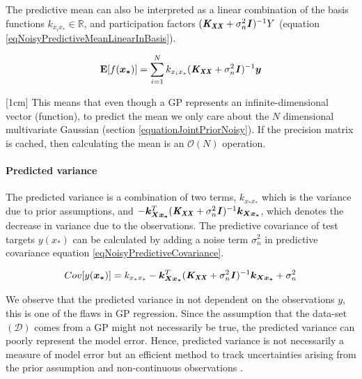 The predictive mean can also be interpreted as a linear combination of the basis functions $k_{x_{i}x_{*}} \in \mathbb{R}$, and participation factors $( \bm{\mathit{K_{XX}}} + \sigma^{2}_{n}\bm{\mathit{I}})^{-1}Y$ (equation \ref{eqNoisyPredictiveMeanLinearInBasis}). 

  \begin{equation}\label{eqNoisyPredictiveMeanLinearInBasis}
  \mathbf{E}[f(\boldsymbol{x_{*}})] = \sum_{i = 1}^{N} k_{x_{i}x_{*}} ( \bm{\mathit{K_{XX}}} + \sigma^{2}_{n}\bm{\mathit{I}})^{-1} \boldsymbol{y}
  \end{equation}

[1cm]  
This means that even though a GP represents an infinite-dimensional vector (function), to predict the mean we only care about the $N$ dimensional multivariate Gaussian (section \ref{equationJointPriorNoisy}). If the precision matrix is cached, then calculating the mean is an $\mathcal{O}\left ( N \right )$ operation.

\paragraph{Predicted variance}
The predicted variance is a combination of two terms, $k_{x_{*}x_{*}}$ which is the variance due to prior assumptions, and $- \boldsymbol{k_{Xx_{*}}}^{T}( \bm{\mathit{K_{XX}}} + \sigma^{2}_{n}\bm{\mathit{I}} )^{-1} \boldsymbol{k_{Xx_{*}}}$, which denotes the decrease in variance due to the observations. The predictive covariance of test targets $y(x_{*})$ can be calculated by adding a noise term $\sigma^{2}_{n}$ in predictive covariance equation \ref{eqNoisyPredictiveCovariance}. 

  \begin{equation}\label{eqNoisyPredictiveCovarianceOnNoisyTarget}
	Cov[y(\boldsymbol{x_{*}})] = k_{x_{*}x_{*}} - \boldsymbol{k_{Xx_{*}}}^{T}( \bm{\mathit{K_{XX}}} + \sigma^{2}_{n}\bm{\mathit{I}} )^{-1} \boldsymbol{k_{Xx_{*}}} + \sigma_{n}^{2}
  \end{equation}
  
We observe that the predicted variance in not dependent on the observations $y$, this is one of the flaws in GP regression. Since the assumption that the data-set $(\mathcal{D})$ comes from a GP might not necessarily be true, the predicted variance can poorly represent the model error. Hence, predicted variance is not necessarily a measure of model error but an efficient method to track uncertainties arising from the prior assumption and non-continuous observations \cite{shah2014student}.

